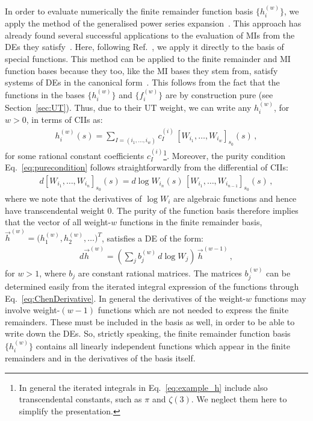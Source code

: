 \documentclass[main.tex]{subfiles}
\begin{document}
In order to evaluate numerically the finite remainder function basis $\{h^{(w)}_i\}$, we apply the method of the generalised power series expansion~\cite{Francesco:2019yqt}. This approach has already found several successful applications to the evaluation of MIs from the DEs they satisfy~\cite{Francesco:2019yqt,Bonciani:2019jyb,Frellesvig:2019byn,Abreu:2020jxa,Becchetti:2020wof,Bonciani:2021zzf,abreu2021twoloop}. Here, following Ref.~\cite{Badger:2021nhg}, we apply it directly to the basis of special functions. This method can be applied to the finite remainder and MI function bases because they too, like the MI bases they stem from, satisfy systems of DEs in the canonical form~\cite{Henn:2013pwa}. This follows from the fact that the functions in the bases $\{h^{(w)}_i\}$ and $\{f^{(w)}_i\}$ are by construction pure (see Section~\ref{sec:UT}). Thus, due to their UT weight, we can write any $h^{(w)}_i$, for $w>0$, in terms of CIIs as:
\begin{align} \label{eq:example_h}
h^{(w)}_{i}(s) = \sum_{I = (i_1,\ldots,i_w)} c_I^{(i)} \, \left[W_{i_1}, \ldots, W_{i_w}  \right]_{s_0} (s) \, ,
\end{align}
for some rational constant coefficients $c_I^{(i)}$\footnote{In general the iterated integrals in Eq.~\ref{eq:example_h} include also transcendental constants, such as $\pi$ and $\zeta(3)$. We neglect them here to simplify the presentation.}.
Moreover, the purity condition Eq.~\ref{eq:purecondition} follows straightforwardly from the differential of CIIs:
\begin{align} \label{eq:ChenDerivative}
d \left[W_{i_1}, \ldots, W_{i_n}  \right]_{s_0} (s) = d \log W_{i_n}(s) \, \left[W_{i_1}, \ldots, W_{i_{n-1}}  \right]_{s_0} (s) \,,
\end{align}
where we note that the derivatives of $\log W_i$ are algebraic functions and hence have transcendental weight $0$.
The purity of the function basis therefore implies that the vector of all weight-$w$ functions in the finite remainder basis, $\vec{h}^{(w)}= \bigl(h^{(w)}_1, h^{(w)}_2, \ldots \bigr)^T$, satisfies a DE of the form:
\begin{align} \label{eq:dhw}
d \vec{h}^{(w)} = \left( \sum_{j} b_j^{(w)} \, d\log W_j  \right) \,  \vec{h}^{(w-1)} \,,
\end{align}
for $w>1$, where $b_j$ are constant rational matrices. The matrices $b_j^{(w)}$ can be determined easily from the iterated integral expression of the functions through Eq.~\ref{eq:ChenDerivative}. 
In general the derivatives of the weight-$w$ functions may involve weight-$(w-1)$ functions which are not needed to express the finite remainders. These must be included in the basis as well, in order to be able to write down the DEs. So, strictly speaking, the finite remainder function basis $\{h^{(w)}_i\}$ contains all linearly independent functions which appear in the finite remainders and in the derivatives of the basis itself.
\end{document}
